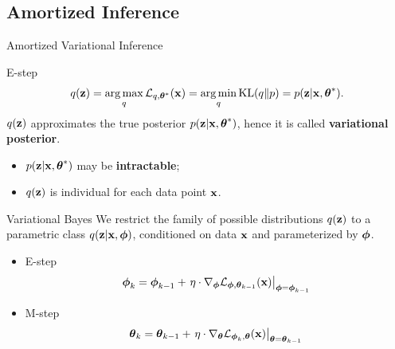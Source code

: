 \documentclass{beamer}
\begin{document}
\subsection{Amortized Inference}
\begin{frame}{Amortized Variational Inference}
	\begin{block}{E-step}
		\vspace{-0.3cm}
		\[
			q(\mathbf{z}) = \operatorname*{arg\,max}_q \mathcal{L}_{q, \boldsymbol{\theta}^*}(\mathbf{x}) = \operatorname*{arg\,min}_q \mathrm{KL}(q \| p) =
		p(\mathbf{z}| \mathbf{x}, \boldsymbol{\theta}^*).
		\]
		\eqpause
		$q(\mathbf{z})$ approximates the true posterior $p(\mathbf{z}| \mathbf{x}, \boldsymbol{\theta}^*)$, hence it is called \textbf{variational posterior}.				
		\eqpause
		\begin{itemize}
			\item {\color{violet}$p(\mathbf{z}| \mathbf{x}, \boldsymbol{\theta}^*)$ may be \textbf{intractable}};
			\item {\color{teal}$q(\mathbf{z})$ is individual for each data point $\mathbf{x}$}.
		\end{itemize}
	\end{block}
	\eqpause
	\begin{block}{Variational Bayes}
		We restrict the family of possible distributions $q(\mathbf{z})$ to a parametric class $q(\mathbf{z}|\mathbf{x}, \boldsymbol{\phi})$, {\color{teal}conditioned on data $\mathbf{x}$} and {\color{violet}parameterized by $\boldsymbol{\phi}$}.
		\eqpause
		\begin{itemize}
			\item E-step
			\[
				\boldsymbol{\phi}_k = \boldsymbol{\phi}_{k-1} + \left.\eta \cdot \nabla_{\boldsymbol{\phi}} \mathcal{L}_{\boldsymbol{\phi}, \boldsymbol{\theta}_{k-1}}(\mathbf{x})\right|_{\boldsymbol{\phi}=\boldsymbol{\phi}_{k-1}}
			\]
			\item M-step
			\[
				\boldsymbol{\theta}_k = \boldsymbol{\theta}_{k-1} + \left.\eta \cdot \nabla_{\boldsymbol{\theta}} \mathcal{L}_{\boldsymbol{\phi}_k, \boldsymbol{\theta}}(\mathbf{x})\right|_{\boldsymbol{\theta}=\boldsymbol{\theta}_{k-1}}
			\]
		\end{itemize}
	\end{block}
\end{frame}
\end{document}
